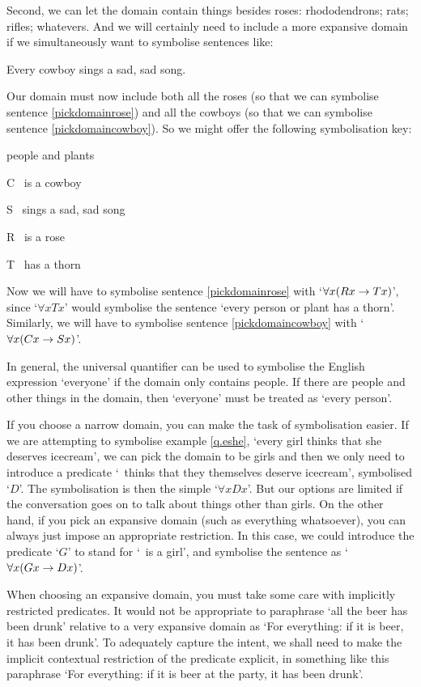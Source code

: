 Second, we can let the domain contain things besides roses: rhododendrons; rats; rifles; whatevers.  And we will certainly need to include a more expansive domain if we simultaneously want to symbolise sentences like:
	\begin{earg}
		\item[\ex{pickdomaincowboy}] Every cowboy sings a sad, sad song.
	\end{earg}
Our domain must now include both all the roses (so that we can symbolise sentence \ref{pickdomainrose}) and all the cowboys (so that we can symbolise sentence \ref{pickdomaincowboy}). So we might offer the following symbolisation key:\label{poison}
	\begin{ekey}
		\item[\domain] people and plants
		\item[C] \blank\ is a cowboy
		\item[S] \blank\ sings a sad, sad song
		\item[R] \blank\ is a rose
		\item[T] \blank\ has a thorn
	\end{ekey}
Now we will have to symbolise sentence \ref{pickdomainrose} with `$\forall x (Rx \rightarrow Tx)$', since `$\forall x Tx$' would symbolise the sentence `every person or plant has a thorn'. Similarly, we will have to symbolise sentence \ref{pickdomaincowboy} with `$\forall x (Cx \rightarrow Sx)$'. 

In general, the universal quantifier can be used to symbolise the English expression `everyone' if the domain only contains people. If there are people and other things in the domain, then `everyone' must be treated as `every person'.

If you choose a narrow domain, you can make the task of symbolisation easier. If we are attempting to symbolise example \ref{q.eshe}, `every girl thinks that she deserves icecream', we can pick the domain to be girls and then we only need to introduce a predicate `\blank\ thinks that they themselves deserve icecream', symbolised `$D$'. The symbolisation is then the simple `$\forall x Dx$'. But our options are limited if the conversation goes on to talk about things other than girls. On the other hand, if you pick an expansive domain (such as everything whatsoever), you can always just impose an appropriate restriction. In this case, we could introduce the predicate `$G$' to stand for `\blank\ is a girl', and symbolise the sentence as `$\forall x (Gx \rightarrow Dx)$'. 

When choosing an expansive domain, you must take some care with implicitly restricted predicates. It would not be appropriate to paraphrase `all the beer has been drunk' relative to a very expansive domain as `For everything: if it is beer, it has been drunk'. To adequately capture the intent, we shall need to make the implicit contextual restriction of the predicate explicit, in something like this paraphrase `For everything: if it is beer at the party, it has been drunk'.


